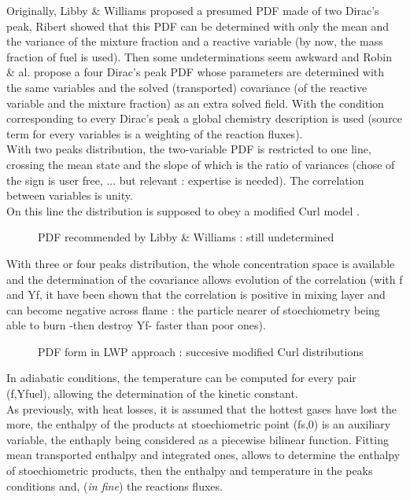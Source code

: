 Originally, Libby \& Williams proposed a presumed PDF made of two
Dirac's peak, Ribert showed that this PDF can be determined with only
the mean and the variance of the mixture fraction and a reactive
variable ({\small by now, the mass fraction of fuel is used}). Then
some undeterminations seem awkward and Robin \& al. propose a four
Dirac's peak PDF whose parameters are determined with the same
variables and the solved ({\small transported}) covariance ({\small of
the reactive variable and the mixture fraction}) as an extra solved
field. With the condition corresponding to every Dirac's peak a global
chemistry description is used ({\small source term for every variables
is a weighting of the reaction fluxes}).\\ With two peaks
distribution, the two-variable PDF is restricted to one line, crossing
the mean state and the slope of which is the ratio of variances
({\small chose of the sign is user free, ... but relevant : expertise
is needed}). The correlation between variables is unity.\\ On this
line the distribution is supposed to obey a modified Curl
model \cite{7}.\\
\begin{figure}[h]
\caption{PDF recommended by Libby \& Williams : still undetermined}
\end{figure}
With three or four peaks distribution, the whole concentration space
is available and the determination of the covariance allows evolution
of the correlation ({\small with f and Yf, it have been shown that the
correlation is positive in mixing layer and can become negative across
flame : the particle nearer of stoechiometry being able to burn -then
destroy Yf- faster than poor ones}). \\
\begin{figure}[h]
\caption{PDF form in LWP approach : succesive modified Curl distributions}
\end{figure}
In adiabatic conditions, the temperature can be computed for every
pair (f,Yfuel), allowing the determination of the kinetic constant.\\
As previously, with heat losses, it is assumed that the hottest gases
have lost the more, the enthalpy of the products at stoechiometric
point (fs,0) is an auxiliary variable, the enthaply being considered
as a piecewise bilinear function. Fitting mean transported enthalpy
and integrated ones, allows to determine the enthalpy of
stoechiometric products, then the enthalpy and temperature in the
peaks conditions and, ({\em in fine}) the reactions fluxes.




